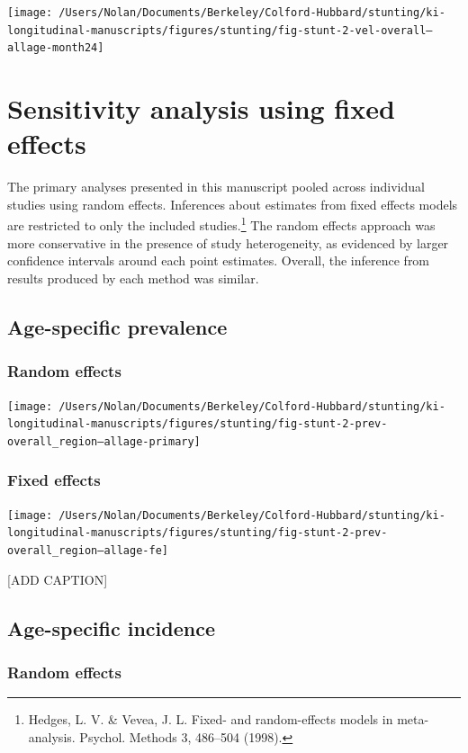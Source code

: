 \documentclass[9pt,]{book}
\let\rmarkdownfootnote\footnote%
\def\footnote{\protect\rmarkdownfootnote}
\begin{document}
\texttt{[image: /Users/Nolan/Documents/Berkeley/Colford-Hubbard/stunting/ki-longitudinal-manuscripts/figures/stunting/fig-stunt-2-vel-overall--allage-month24]}

\chapter{Sensitivity analysis using fixed effects}\label{fixed-effects}

The primary analyses presented in this manuscript pooled across
individual studies using random effects. Inferences about estimates from
fixed effects models are restricted to only the included
studies.\footnote{Hedges, L. V. \& Vevea, J. L. Fixed- and
  random-effects models in meta-analysis. Psychol. Methods 3, 486--504
  (1998).} The random effects approach was more conservative in the
presence of study heterogeneity, as evidenced by larger confidence
intervals around each point estimates. Overall, the inference from
results produced by each method was similar.

\section{Age-specific prevalence}\label{age-specific-prevalence-2}

\subsection{Random effects}\label{random-effects}

\texttt{[image: /Users/Nolan/Documents/Berkeley/Colford-Hubbard/stunting/ki-longitudinal-manuscripts/figures/stunting/fig-stunt-2-prev-overall\_region--allage-primary]}

\subsection{Fixed effects}\label{fixed-effects}

\texttt{[image: /Users/Nolan/Documents/Berkeley/Colford-Hubbard/stunting/ki-longitudinal-manuscripts/figures/stunting/fig-stunt-2-prev-overall\_region--allage-fe]}

{[}ADD CAPTION{]}

\section{Age-specific incidence}\label{age-specific-incidence-2}

\subsection{Random effects}\label{random-effects-1}
\end{document}
